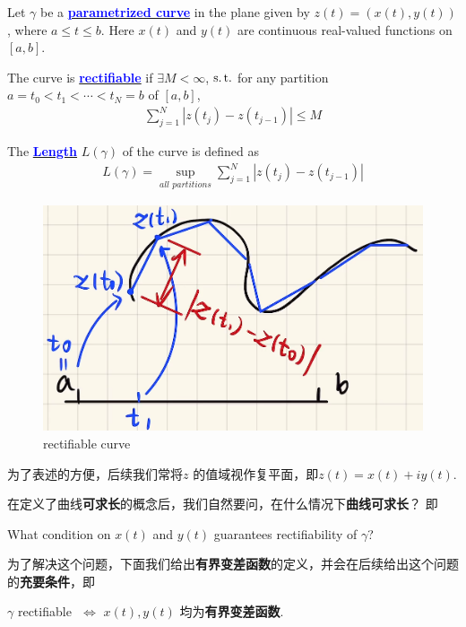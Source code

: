 	\begin{defn}\label{def 4.4.1}
		Let $\gamma$ be a \underline{\textcolor{blue}{\textbf{parametrized curve}}} in the plane given by $z(t) = (x(t) , y(t))$, where $a \leq t \leq b$. Here $x(t)$ and $y(t)$ are continuous real-valued functions on $[a , b]$. 
		
		\vspace{1em}
		
		The curve is \underline{\textcolor{blue}{\textbf{rectifiable}}} if $\exists M < \infty$, $\operatorname{s.t.}$ for any partition $a = t_0 < t_1 < \cdots < t_N = b$ of $[a , b]$,
		\begin{align}
			\sum_{j = 1}^{N}{\left| z(t_j) - z(t_{j - 1}) \right|} \leq M
		\end{align}
	
		\vspace{1em}
		
		The \underline{\textcolor{blue}{\textbf{Length}}} $L(\gamma)$ of the curve is defined as
		\begin{align}
			L(\gamma) = \sup_{all \,\, partitions}{\sum_{j = 1}^{N}{\left| z(t_j) - z(t_{j - 1}) \right|}}
		\end{align}
	
		\begin{figure}[thbp!]
			\centering
			\includegraphics[width=0.4\linewidth]{figure/4.4.1-1}
			\caption{rectifiable curve}
			\label{pic : 4.4.1-1} %
		\end{figure}
		
		\begin{rmk}
			为了表述的方便，后续我们常将$z$ 的值域视作复平面，即$z(t) = x(t) + iy(t)$.
		\end{rmk}
	\end{defn}

	\vspace{2em}
	在定义了曲线\textbf{可求长}的概念后，我们自然要问，在什么情况下\textbf{曲线可求长}？ 即
	\begin{center}
		What condition on $x(t)$ and $y(t)$ guarantees rectifiability of $\gamma$?
	\end{center}
	为了解决这个问题，下面我们给出\textbf{有界变差函数}的定义，并会在后续给出这个问题的\textbf{充要条件}，即
	\begin{center}
		$\gamma$ rectifiable $\,\, \Leftrightarrow \,\, x(t), y(t)$ 均为\textbf{有界变差函数}.
	\end{center}

